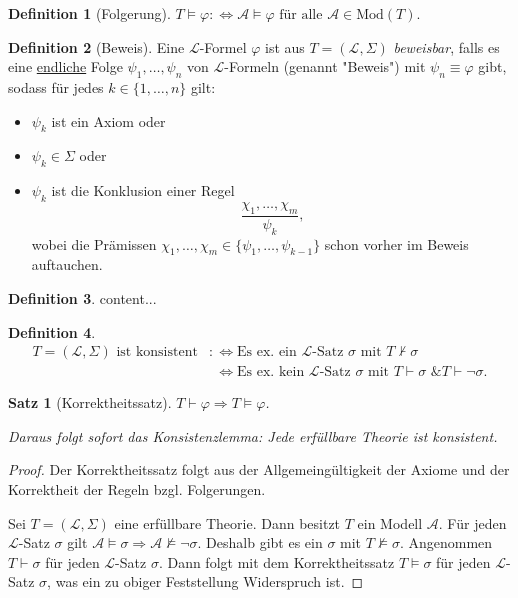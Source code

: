 \documentclass[german,headsepline,fleqn,parskip=half]{scrartcl}
\theoremstyle{definition}
\newtheorem*{dfn}{Definition}
\theoremstyle{plain}
\newtheorem*{thm}{Satz}
\newcommand{\lng}{\mathcal{L}}
\newcommand{\modA}{\mathcal{A}}
\newcommand{\Mod}{\text{Mod}}
\begin{document}
	\begin{dfn}[Folgerung]
		$T\models\varphi:\Leftrightarrow\modA\models\varphi\text{ für alle }\modA\in\Mod(T)$.
	\end{dfn}

	\begin{dfn}[Beweis]
		Eine $\lng$-Formel $\varphi$ ist aus $T=(\lng,\Sigma)$ \emph{beweisbar},
		falls es eine \underline{endliche} Folge $\psi_1,\dots,\psi_n$ von $\lng$-Formeln (genannt "Beweis") mit $\psi_n\equiv\varphi$ gibt,
		sodass für jedes $k\in\{1,\dots,n\}$ gilt:
		\begin{itemize}
			\item $\psi_k$ ist ein Axiom oder
			\item $\psi_k\in\Sigma$ oder
			\item $\psi_k$ ist die Konklusion einer Regel
				\[\frac{\chi_1,\dots,\chi_m}{\psi_k}\text{,}\]
				wobei die Prämissen $\chi_1,\dots,\chi_m\in\{\psi_1,\dots,\psi_{k-1}\}$ schon vorher im Beweis auftauchen.
		\end{itemize}
	\end{dfn}

	\begin{dfn}
		content...
	\end{dfn}

	\begin{dfn}
		\begin{align*}
			T=(\lng,\Sigma)\text{ ist konsistent}
			&:\Leftrightarrow\text{Es ex. ein $\lng$-Satz $\sigma$ mit }T\not\vdash\sigma \\
			&\phantom{:}\Leftrightarrow\text{Es ex. kein $\lng$-Satz $\sigma$ mit }T\vdash\sigma\text{ \& }T\vdash\lnot\sigma\text{.}
		\end{align*}
	\end{dfn}

	\begin{thm}[Korrektheitssatz]
		$T\vdash\varphi\Rightarrow T\models\varphi$.
		
		Daraus folgt sofort das Konsistenzlemma: Jede erfüllbare Theorie ist konsistent.
	\end{thm}
	\begin{proof}
		Der Korrektheitssatz folgt aus der Allgemeingültigkeit der Axiome und der Korrektheit der Regeln bzgl. Folgerungen.
		
		Sei $T=(\lng,\Sigma)$ eine erfüllbare Theorie.
		Dann besitzt $T$ ein Modell $\modA$.
		Für jeden $\lng$-Satz $\sigma$ gilt $\modA\models\sigma\Rightarrow\modA\not\models\lnot\sigma$.
		Deshalb gibt es ein $\sigma$ mit $T\not\models\sigma$.
		Angenommen $T\vdash\sigma$ für jeden $\lng$-Satz $\sigma$.
		Dann folgt mit dem Korrektheitssatz $T\models\sigma$ für jeden $\lng$-Satz $\sigma$,
		was ein zu obiger Feststellung Widerspruch ist.
	\end{proof}
\end{document}
